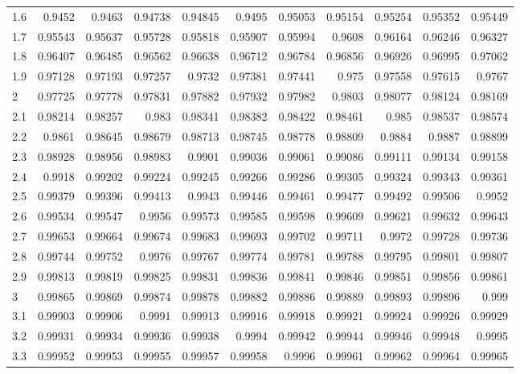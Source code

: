 \documentclass[twoside]{book}
\begin{document}
\begin{table}[!h]
\begin{tabular}{l|*{10}{r}}
1.6 & 0.9452  & 0.9463  & 0.94738 & 0.94845 & 0.9495  & 0.95053 & 0.95154 & 0.95254 & 0.95352 & 0.95449 \\
1.7 & 0.95543 & 0.95637 & 0.95728 & 0.95818 & 0.95907 & 0.95994 & 0.9608  & 0.96164 & 0.96246 & 0.96327 \\
1.8 & 0.96407 & 0.96485 & 0.96562 & 0.96638 & 0.96712 & 0.96784 & 0.96856 & 0.96926 & 0.96995 & 0.97062 \\
1.9 & 0.97128 & 0.97193 & 0.97257 & 0.9732  & 0.97381 & 0.97441 & 0.975   & 0.97558 & 0.97615 & 0.9767  \\
2   & 0.97725 & 0.97778 & 0.97831 & 0.97882 & 0.97932 & 0.97982 & 0.9803  & 0.98077 & 0.98124 & 0.98169 \\
2.1 & 0.98214 & 0.98257 & 0.983   & 0.98341 & 0.98382 & 0.98422 & 0.98461 & 0.985   & 0.98537 & 0.98574 \\
2.2 & 0.9861  & 0.98645 & 0.98679 & 0.98713 & 0.98745 & 0.98778 & 0.98809 & 0.9884  & 0.9887  & 0.98899 \\
2.3 & 0.98928 & 0.98956 & 0.98983 & 0.9901  & 0.99036 & 0.99061 & 0.99086 & 0.99111 & 0.99134 & 0.99158 \\
2.4 & 0.9918  & 0.99202 & 0.99224 & 0.99245 & 0.99266 & 0.99286 & 0.99305 & 0.99324 & 0.99343 & 0.99361 \\
2.5 & 0.99379 & 0.99396 & 0.99413 & 0.9943  & 0.99446 & 0.99461 & 0.99477 & 0.99492 & 0.99506 & 0.9952  \\
2.6 & 0.99534 & 0.99547 & 0.9956  & 0.99573 & 0.99585 & 0.99598 & 0.99609 & 0.99621 & 0.99632 & 0.99643 \\
2.7 & 0.99653 & 0.99664 & 0.99674 & 0.99683 & 0.99693 & 0.99702 & 0.99711 & 0.9972  & 0.99728 & 0.99736 \\
2.8 & 0.99744 & 0.99752 & 0.9976  & 0.99767 & 0.99774 & 0.99781 & 0.99788 & 0.99795 & 0.99801 & 0.99807 \\
2.9 & 0.99813 & 0.99819 & 0.99825 & 0.99831 & 0.99836 & 0.99841 & 0.99846 & 0.99851 & 0.99856 & 0.99861 \\
3   & 0.99865 & 0.99869 & 0.99874 & 0.99878 & 0.99882 & 0.99886 & 0.99889 & 0.99893 & 0.99896 & 0.999   \\
3.1 & 0.99903 & 0.99906 & 0.9991  & 0.99913 & 0.99916 & 0.99918 & 0.99921 & 0.99924 & 0.99926 & 0.99929 \\
3.2 & 0.99931 & 0.99934 & 0.99936 & 0.99938 & 0.9994  & 0.99942 & 0.99944 & 0.99946 & 0.99948 & 0.9995  \\
3.3 & 0.99952 & 0.99953 & 0.99955 & 0.99957 & 0.99958 & 0.9996  & 0.99961 & 0.99962 & 0.99964 & 0.99965 \\

\end{tabular}
\end{table}
\end{document}
